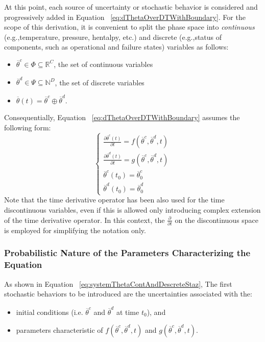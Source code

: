 At this point, each source of uncertainty or stochastic behavior is considered and progressively added in
Equation ~\ref{eq:dThetaOverDTWithBoundary}.
For the scope of this derivation, it is convenient to split the phase space into \textit{continuous} (e.g.,temperature,
pressure, hentalpy, etc.) and discrete (e.g.,status of components, such as operational and failure states) variables
as follows:
\begin{itemize}
 \item $ \overline{\theta}^{c} \in \Phi \subseteq \mathbb{R}^{C}$, the set of continuous variables
 \item $ \overline{\theta}^{d} \in \Psi \subseteq \mathbb{N}^{D}$, the set of discrete variables
 \item $\overline{\theta}(t) = \overline{\theta}^{c} \oplus \overline{\theta}^{d}$.
\end{itemize}
Consequentially, Equation ~\ref{eq:dThetaOverDTWithBoundary} assumes the following form:
\begin{equation}
\label{eq:systemThetaContAndDescrete}
\left\{\begin{matrix}
\frac{\partial  \overline{\theta}^{c}\left ( t \right )}{\partial t}=f\left ( \overline{\theta}^{c},\overline{\theta}^{d},t \right ) \\
\frac{\partial  \overline{\theta}^{d}\left ( t \right )}{\partial t}=g\left ( \overline{\theta}^{c},\overline{\theta}^{d},t \right )\\
 \overline{\theta}^{c}\left ( t_{0} \right ) = \overline{\theta}^{c}_{0}\\
 \overline{\theta}^{d}\left ( t_{0} \right ) = \overline{\theta}^{d}_{0}
\end{matrix}\right.
\end{equation}
Note that the time derivative operator has been also used for the time discontinuous variables, even
if this is allowed only introducing complex extension of the time derivative operator. In this context, the $\frac{\partial  }{\partial t}$ on the discontinuous space is employed for simplifying the notation only.

\subsubsection{Probabilistic Nature of the Parameters Characterizing the Equation}
As shown in Equation ~\ref{eq:systemThetaContAndDescreteStaz}, The first stochastic behaviors to be introduced are the
uncertainties associated with the:
\begin{itemize}
  \item initial conditions (i.e. $\overline{\theta}^{c}$ and $\overline{\theta}^{d}$ at time $t_{0}$), and
  \item parameters characteristic of  $f\left ( \overline{\theta}^{c},\overline{\theta}^{d},t \right )$ and $g\left ( \overline{\theta}^{c},\overline{\theta}^{d},t \right )$.
\end{itemize}

